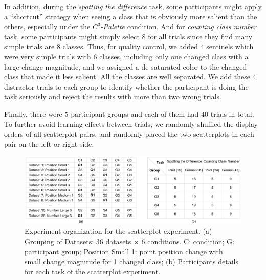 {In addition, during the \emph{spotting the difference} task, some participants might apply a ``shortcut'' strategy when seeing a class that is obviously more salient than the others, especially under the \emph{$C^3$-Palette} condition.
And for \emph{counting class number} task, some participants might simply select 8 for all trials since they find many simple trials are 8 classes.
Thus, for quality control, we added $4$ sentinels which were very simple trials with 6 classes, including only one changed class with a large change magnitude, and we assigned a de-saturated color to the changed class that made it less salient. All the classes are well separated. We add these 4 distractor trials to each group to identify whether the participant is doing the task seriously and reject the results with more than two wrong trials.

Finally, there were $5$ participant groups and each of them had $40$ trials in total. To further avoid learning effects between trials, we randomly shuffled the display orders of all scatterplot pairs, and randomly placed the two scatterplots in each pair on the left or right side.

\begin{figure}[h]
\centering
\includegraphics[width=1\linewidth]{figures/experiment-organization.pdf}
\caption{Experiment organization for the scatterplot experiment. (a) Grouping of Datasets: $36$ datasets $\times$ $6$ conditions. C: condition; G: participant group; Position Small 1: point position change with small change magnitude for 1 changed class; (b) Participants details for each task of the scatterplot experiment.}
\vspace*{-3mm}
\label{fig:experimentOrgan}
\end{figure}

}

